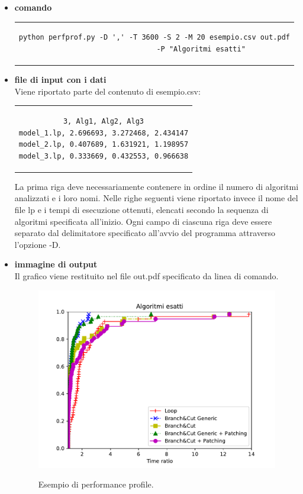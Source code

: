\begin{itemize}
\item{\textbf{comando}
\begin{center}
\begin{tabular}{c}
\begin{lstlisting}[linewidth=330pt, basicstyle=\footnotesize\sffamily,] 
python perfprof.py -D ',' -T 3600 -S 2 -M 20 esempio.csv out.pdf
		              -P "Algoritmi esatti"
\end{lstlisting}
\end{tabular}
\end{center}
}
\item{\textbf{file di input con i dati}\\
Viene riportato parte del contenuto di esempio.csv:
\begin{center}
\begin{tabular}{c}
\begin{lstlisting}[linewidth=240pt, basicstyle=\footnotesize\sffamily,] 
3, Alg1, Alg2, Alg3
model_1.lp, 2.696693, 3.272468, 2.434147
model_2.lp, 0.407689, 1.631921, 1.198957
model_3.lp, 0.333669, 0.432553, 0.966638
\end{lstlisting}
\end{tabular}
\end{center}
La prima riga deve necessariamente contenere in ordine il numero di algoritmi analizzati e i loro nomi. Nelle righe seguenti viene riportato invece il nome del file lp e i tempi di esecuzione ottenuti, elencati secondo la sequenza di algoritmi specificata all'inizio.
Ogni campo di ciascuna riga deve essere separato dal delimitatore specificato all'avvio del programma attraverso l'opzione -D.
}
\item{\textbf{immagine di output}\\
Il grafico viene restituito nel file out.pdf specificato da linea di comando.
\begin{figure}[h] 
\begin{center} 
  \includegraphics[scale=0.8]{Images/pp_exact}\\
  \caption{\footnotesize{Esempio di performance profile.}} 
\end{center} 
\end{figure}
}
\end{itemize}